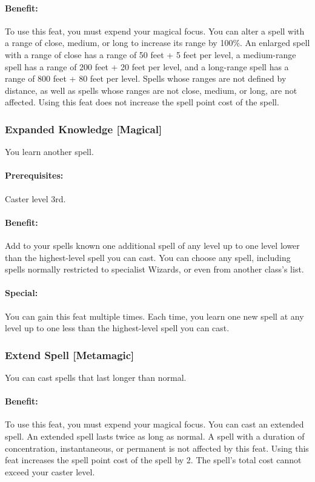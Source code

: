 \paragraph{Benefit:} To use this feat, you must expend your magical focus. 
You can alter a spell with a range of close, medium, or long to increase its range by 100\%. 
An enlarged spell with a range of close has a range of 50 feet + 5 feet per level, 
a medium-range spell has a range of 200 feet + 20 feet per level, 
and a long-range spell has a range of 800 feet + 80 feet per level.
Spells whose ranges are not defined by distance, as well as spells whose ranges are not close, medium, or long, are not affected.
Using this feat does not increase the spell point cost of the spell.

\subsubsection[Expanded Knowledge]{Expanded Knowledge [Magical]}
\label{Feat:ExpandedKnowledge}
You learn another spell.

\paragraph{Prerequisites:} Caster level 3rd.

\paragraph{Benefit:} Add to your spells known one additional spell of any level up to one level lower than the highest-level spell you can cast. 
You can choose any spell, including spells normally restricted to specialist Wizards, or even from another class's list.

\paragraph{Special:} You can gain this feat multiple times. Each time, you learn one new spell at any level up to one less than the highest-level spell you can cast.

\subsubsection[Extend Spell]{Extend Spell [Metamagic]}
\label{Feat:ExtendSpell}
You can cast spells that last longer than normal.

\paragraph{Benefit:} To use this feat, you must expend your magical focus.
You can cast an extended spell. An extended spell lasts twice as long as normal. 
A spell with a duration of concentration, instantaneous, or permanent is not affected by this feat.
Using this feat increases the spell point cost of the spell by 2. The spell's total cost cannot exceed your caster level.

